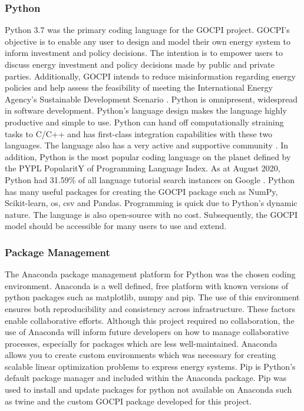 \documentclass[12pt]{article}
\begin{document}
\subsubsection{Python}\label{python}
Python 3.7 was the primary coding language for the GOCPI project. 
GOCPI's objective is to enable any user to design and model their own energy system to inform investment and policy decisions.
The intention is to empower users to discuss energy investment and policy decisions made by public and private parties.
Additionally, GOCPI intends to reduce misinformation regarding energy policies and help assess the feasibility of meeting the International Energy Agency's Sustainable Development Scenario \cite{IEA_WEM}.
Python is omnipresent, widespread in software development. 
Python's language design makes the language highly productive and simple to use. 
Python can hand off computationally straining tasks to C/C++ and has first-class integration capabilities with these two languages.
The language also has a very active and supportive community \cite{Python_Features}.
In addition, Python is the most popular coding language on the planet defined by the PYPL PopularitY of Programming Language Index. As at August 2020, Python had 31.59\% of all language tutorial search instances on Google \cite{PYPL_Pop}.
Python has many useful packages for creating the GOCPI package such as NumPy, Scikit-learn, os, csv and Pandas. 
Programming is quick due to Python's dynamic nature.
The language is also open-source with no cost.
Subsequently, the GOCPI model should be accessible for many users to use and extend.

\subsubsection{Package Management}
The Anaconda package management platform for Python \cite{Anaconda} was the chosen coding environment.
Anaconda is a well defined, free platform with known versions of python packages such as matplotlib, numpy and pip.
The use of this environment ensures both reproducibility and consistency across infrastructure.
These factors enable collaborative efforts. 
Although this project required no collaboration, the use of Anaconda will inform future developers on how to manage collaborative processes, especially for packages
which are less well-maintained. Anaconda allows you to create custom environments which was necessary for creating scalable linear optimization problems to express energy systems.
Pip is Python's default package manager and included within the Anaconda package. 
Pip was used to install and update packages for python not available on Anaconda such as twine and the custom GOCPI package developed for this project.
\end{document}
